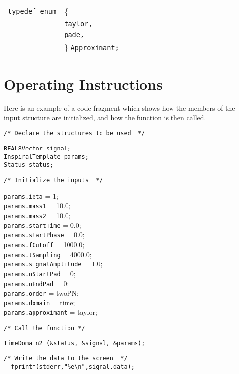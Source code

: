 \documentclass[12pt]{article}
\begin{document}
\vspace{5mm}

\begin{tabular}{ll}
\texttt{typedef enum} & \{ \\
                      & \texttt{taylor,} \\
                      & \texttt{pade,}  \\
                      & \} \texttt{Approximant;}
\end{tabular}

\vspace{5mm}


\section{Operating Instructions}

Here is an example of a code fragment which shows how the members of the input structure are initialized, and how the function is then called.

\vspace{5mm}

\noindent
\begin{verbatim}
/* Declare the structures to be used  */
\end{verbatim}
\texttt{REAL8Vector signal;} \\
\texttt{InspiralTemplate params;} \\
\texttt{Status status;} \\
\begin{verbatim}
/* Initialize the inputs  */
\end{verbatim}
\texttt{params.ieta} = 1; \\
\texttt{params.mass1} = 10.0; \\
\texttt{params.mass2} = 10.0; \\
\texttt{params.startTime} = 0.0; \\
\texttt{params.startPhase} = 0.0; \\
\texttt{params.fCutoff} = 1000.0; \\
\texttt{params.tSampling} = 4000.0; \\
\texttt{params.signalAmplitude} = 1.0; \\
\texttt{params.nStartPad} = 0; \\
\texttt{params.nEndPad} = 0; \\
\texttt{params.order} = twoPN; \\
\texttt{params.domain} = time; \\
\texttt{params.approximant} = taylor; \\
\begin{verbatim}
/* Call the function */
\end{verbatim}
\texttt{TimeDomain2 (\&status, \&signal, \&params);}
\begin{verbatim}
/* Write the data to the screen  */
  fprintf(stderr,"%e\n",signal.data); 
\end{verbatim}
\end{document}
